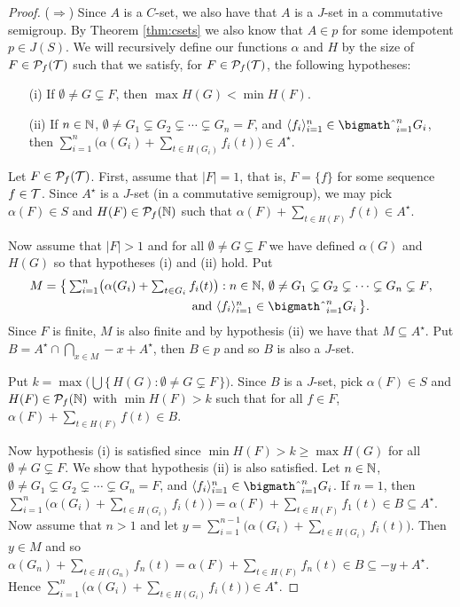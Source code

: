 \begin{proof}
  ($\Rightarrow$)
  Since $A$ is a $C$-set, we also have that $A$ is a $J$-set in a commutative semigroup.
  By Theorem \ref{thm:csets} we also know that $A \in p$ for some idempotent $p \in J(S)$. 
  We will recursively define our functions $\alpha$ and $H$ by the size of $F \in \mathcal{P}_f(\mathcal{T})$ such that we satisfy, for $F \in \mathcal{P}_f(\mathcal{T})$, the following hypotheses:
  \begin{itemize}
    \item[(i)] If $\emptyset \ne G \subsetneq F$, then $\max H(G) < \min H(F)$.
      
    \item[(ii)] If $n \in \mathbb{N}$, $\emptyset \ne G_1 \subsetneq G_2 \subsetneq \cdots \subsetneq G_n = F$, and $\la f_i \ra_{i=1}^n \in \bigtimes_{i=1}^n G_i$, then $\sum_{i=1}^n\bigl( \alpha(G_i) + \sum_{t \in H(G_i)} f_i(t)\bigr) \in A^\star$. 
  \end{itemize}
  
  Let $F \in \mathcal{P}_f(\mathcal{T})$.
  First, assume that $|F| = 1$, that is, $F = \{f\}$ for some sequence $f \in \mathcal{T}$.
  Since $A^\star$ is a $J$-set (in a commutative semigroup), we may pick $\alpha(F) \in S$ and $H(F) \in \mathcal{P}_f(\mathbb{N})$ such that $\alpha(F) + \sum_{t \in H(F)} f(t) \in A^\star$.

  Now assume that $|F| > 1$ and for all $\emptyset \ne G \subsetneq F$ we have defined $\alpha(G)$ and $H(G)$ so that hypotheses (i) and (ii) hold.
  Put
  \begin{align*}
    M &=\textstyle \bigl\{\, \sum_{i=1}^n \bigl( \alpha(G_i) + \sum_{t \in G_i} f_i(t) \bigr) : \mbox{$n \in \bbN$, $\emptyset \ne G_1 \subsetneq G_2 \subsetneq \cdots \subsetneq G_n \subsetneq F$,} \\
    &\hspace{12em} \mbox{and $\la f_i \ra_{i=1}^n \in \bigtimes_{i=1}^n G_i$} \,\bigr\}.
  \end{align*}
  Since $F$ is finite, $M$ is also finite and by hypothesis (ii) we have that $M \subseteq A^\star$.
  Put $B = A^\star \cap \bigcap_{x \in M} -x+A^\star$, then $B \in p$ and so $B$ is also a $J$-set.

  Put $k = \max \bigl( \bigcup\{\, H(G) : \emptyset \ne G \subsetneq F\,\} \bigr)$.
  Since $B$ is a $J$-set, pick $\alpha(F) \in S$ and $H(F) \in \mathcal{P}_f(\mathbb{N})$ with $\min H(F) > k$ such that for all $f \in F$, $\alpha(F) + \sum_{t \in H(F)} f(t) \in B$. 

  Now hypothesis (i) is satisfied since $\min H(F) > k \ge \max H(G)$ for all $\emptyset \ne G \subsetneq F$. 
  We show that hypothesis (ii) is also satisfied.
  Let $n \in \mathbb{N}$, $\emptyset \ne G_1 \subsetneq G_2 \subsetneq \cdots \subsetneq G_n = F$, and $\la f_i \ra_{i=1}^n \in \bigtimes_{i=1}^n G_i$. 
  If $n = 1$, then $\sum_{i=1}^n \bigl( \alpha(G_i) + \sum_{t \in H(G_i)} f_i(t)\bigr) = \alpha(F) + \sum_{t \in H(F)} f_1(t) \in B \subseteq A^\star$. 
  Now assume that $n > 1$ and let $y = \sum_{i=1}^{n-1}\bigl( \alpha(G_i) + \sum_{t \in H(G_i)} f_i(t) \bigr)$.
  Then $y \in M$ and so $\alpha(G_n) + \sum_{t \in H(G_n)} f_n(t) = \alpha(F) + \sum_{t \in H(F)} f_n(t) \in B \subseteq -y + A^\star$. 
  Hence $\sum_{i=1}^n\bigl( \alpha(G_i) + \sum_{t \in H(G_i)} f_i(t) \bigr) \in A^\star$.


\end{proof}
